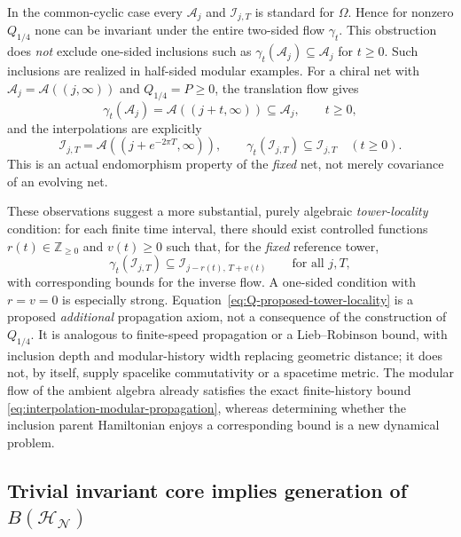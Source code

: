 \documentclass[a4paper,11pt]{article}
\theoremstyle{definition}
\newcommand{\mA}{\mathcal{A}}%
\newcommand{\mN}{\mathcal{N}}
\newcommand{\mI}{\mathcal{I}}
\newcommand{\mH}{\mathcal{H}}
\newcommand{\mM}{\mathcal{M}}
\begin{document}
In the common-cyclic case every $\mA_j$ and $\mI_{j,T}$ is
standard for $\Omega$. Hence for nonzero $Q_{1/4}$ none can be
invariant under the entire two-sided flow $\gamma_t$.
This obstruction does \emph{not} exclude one-sided inclusions such
as $\gamma_t(\mA_j)\subseteq\mA_j$ for $t\geq0$.
Such inclusions are realized in half-sided modular examples.
For a chiral net with $\mA_j=\mathcal A((j,\infty))$ and
$Q_{1/4}=P\geq0$, the translation flow gives
\begin{equation}
 \gamma_t(\mA_j)=\mathcal A((j+t,\infty))
 \subseteq\mA_j,\qquad t\geq0,
 \label{eq:Q-half-sided-tower-locality}
\end{equation}
and the interpolations are explicitly
\begin{equation}
 \mI_{j,T}=\mathcal A((j+e^{-2\pi T},\infty)),\qquad
 \gamma_t(\mI_{j,T})\subseteq\mI_{j,T}\quad(t\geq0).
 \label{eq:Q-half-sided-interpolation-locality}
\end{equation}
This is an actual endomorphism property of the \emph{fixed}
net, not merely covariance of an evolving net.

These observations suggest a more substantial, purely algebraic
\emph{tower-locality} condition: for each finite time interval,
there should exist controlled functions $r(t)\in\mathbb Z_{\geq0}$
and $v(t)\geq0$ such that, for the \emph{fixed} reference tower,
\begin{equation}
 \gamma_t(\mI_{j,T})
 \subseteq\mI_{j-r(t),\,T+v(t)}
 \qquad\text{for all }j,T,
 \label{eq:Q-proposed-tower-locality}
\end{equation}
with corresponding bounds for the inverse flow.
A one-sided condition with $r=v=0$ is especially strong.
Equation~\eqref{eq:Q-proposed-tower-locality} is a proposed
\emph{additional} propagation axiom, not a consequence of the
construction of $Q_{1/4}$. It is analogous to finite-speed
propagation or a Lieb--Robinson bound, with inclusion depth and
modular-history width replacing geometric distance; it does not,
by itself, supply spacelike commutativity or a spacetime metric.
The modular flow of the ambient algebra already satisfies the
exact finite-history bound
\eqref{eq:interpolation-modular-propagation}, whereas determining
whether the inclusion parent Hamiltonian enjoys a corresponding
bound is a new dynamical problem.

\subsection{Trivial invariant core implies generation of $B(\mH_{\mN})$}
\end{document}
